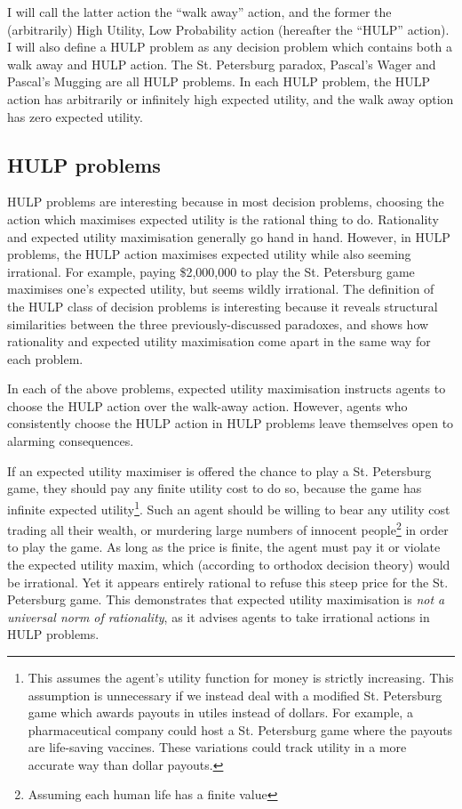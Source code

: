 \documentclass{article}
\begin{document}
I will call the latter action the ``walk away'' action, and the former the (arbitrarily) High Utility, Low Probability action (hereafter the ``HULP'' action). I will also define a HULP problem as any decision problem which contains both a walk away and HULP action. The St. Petersburg paradox, Pascal's Wager and Pascal's Mugging are all HULP problems. In each HULP problem, the HULP action has arbitrarily or infinitely high expected utility, and the walk away option has zero expected utility. 

\subsection{HULP problems}

HULP problems are interesting because in most decision problems, choosing the action which maximises expected utility is the rational thing to do. Rationality and expected utility maximisation generally go hand in hand. However, in HULP problems, the HULP action maximises expected utility while also seeming irrational. For example, paying \$2,000,000 to play the St. Petersburg game maximises one's expected utility, but seems wildly irrational. The definition of the HULP class of decision problems is interesting because it reveals structural similarities between the three previously-discussed paradoxes, and shows how rationality and expected utility maximisation come apart in the same way for each problem.

In each of the above problems, expected utility maximisation instructs agents to choose the HULP action over the walk-away action. However, agents who consistently choose the HULP action in HULP problems leave themselves open to alarming consequences.

If an expected utility maximiser is offered the chance to play a St. Petersburg game, they should pay any finite utility cost to do so, because the game has infinite expected utility\footnote{This assumes the agent's utility function for money is strictly increasing. This assumption is unnecessary if we instead deal with a modified St. Petersburg game which awards payouts in utiles instead of dollars. For example, a pharmaceutical company could host a St. Petersburg game where the payouts are life-saving vaccines. These variations could track utility in a more accurate way than dollar payouts.}. Such an agent should be willing to bear any utility cost \textemdash{} trading all their wealth, or murdering large numbers of innocent people\footnote{Assuming each human life has a finite value} \textemdash{} in order to play the game. As long as the price is finite, the agent must pay it or violate the expected utility maxim, which (according to orthodox decision theory) would be irrational. Yet it appears entirely rational to refuse this steep price for the St. Petersburg game. This demonstrates that expected utility maximisation is \textit{not a universal norm of rationality}, as it advises agents to take irrational actions in HULP problems.
\end{document}
